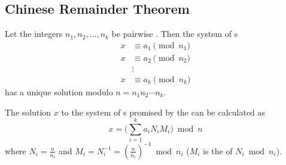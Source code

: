 \subsection{Chinese Remainder Theorem}\label{subsec:Chinese_Remainder_Theorem}
\begin{theorem}\label{thm:Chinese_Remainder_Theorem}
  Let the integers $n_{1}, n_{2}, \ldots, n_{k}$ be pairwise .
  Then the system of s
  \begin{align*}
    x &\equiv a_{1} \pmod{n_{1}} \\
    x &\equiv a_{2} \pmod{n_{2}} \\
      &\vdots \\
    x &\equiv a_{k} \pmod{n_{k}}
  \end{align*}
  has a unique solution modulo $n = n_{1}n_{2} \cdots n_{k}$.
\end{theorem}

\begin{definition}\label{def:Gauss_Algorithm}
  The solution $x$ to the system of s promised by the  can be calculated as
  \begin{equation}\label{eq:Gauss_Algorithm}
    x = \Biggl( \sum\limits_{i=1}^{k}a_{i} N_{i} M_{i} \Biggr) \bmod n
  \end{equation}
  where $N_{i} = \frac{n}{n_{i}}$ and $M_{i} = N_{i}^{-1} = {\left( \frac{n}{n_{i}} \right)}^{-1} \bmod n_{i}$ ($M_{i}$ is the  of $N_{i} \bmod n_{i}$).
\end{definition}

